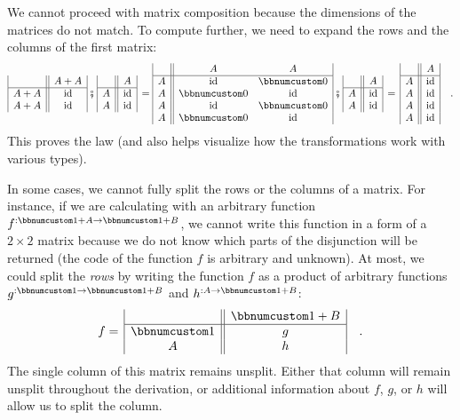 We cannot proceed with matrix composition because the dimensions of
the matrices do not match. To compute further, we need to expand the
rows and the columns of the first matrix:
\[
\begin{array}{|c||c|}
 & A+A\\
\hline A+A & \text{id}\\
A+A & \text{id}
\end{array}\,\bef\,\begin{array}{|c||c|}
 & A\\
\hline A & \text{id}\\
A & \text{id}
\end{array}\,=\begin{array}{|c||cc|}
 & A & A\\
\hline A & \text{id} & \bbnum 0\\
A & \bbnum 0 & \text{id}\\
A & \text{id} & \bbnum 0\\
A & \bbnum 0 & \text{id}
\end{array}\,\bef\,\begin{array}{|c||c|}
 & A\\
\hline A & \text{id}\\
A & \text{id}
\end{array}\,=\,\begin{array}{|c||c|}
 & A\\
\hline A & \text{id}\\
A & \text{id}\\
A & \text{id}\\
A & \text{id}
\end{array}\quad.
\]
This proves the law (and also helps visualize how the transformations
work with various types).

In some cases, we cannot fully split the rows or the columns of a
matrix. For instance, if we are calculating with an arbitrary function
$f^{:\bbnum 1+A\rightarrow\bbnum 1+B}$, we cannot write this function
in a form of a $2\times2$ matrix because we do not know which parts
of the disjunction will be returned (the code of the function $f$
is arbitrary and unknown). At most, we could split the \emph{rows}
by writing the function $f$ as a product of arbitrary functions $g^{:\bbnum 1\rightarrow\bbnum 1+B}$
and $h^{:A\rightarrow\bbnum 1+B}$:
\[
f=\,\begin{array}{|c||c|}
 & \bbnum 1+B\\
\hline \bbnum 1 & g\\
A & h
\end{array}\quad.
\]
The single column of this matrix remains unsplit. Either that column
will remain unsplit throughout the derivation, or additional information
about $f$, $g$, or $h$ will allow us to split the column.

